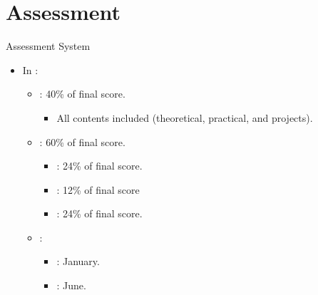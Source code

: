 \section{Assessment}

\begin{frame}[t]{Assessment System}
\begin{itemize}
  \item In :

    \begin{itemize}
      \item {}: 40\% of final score.
        \begin{itemize}
          \item All contents included (theoretical, practical, and projects).
        \end{itemize}

      \item {}: 60\% of final score.
        \begin{itemize}
          \item {}: 24\% of final score.
          \item {}: 12\% of final score
          \item {}: 24\% of final score.
        \end{itemize}

    \item {}:
      \begin{itemize}
        \item {}: January.
        \item {}: June.
      \end{itemize}
  \end{itemize}
\end{itemize}
\end{frame}

